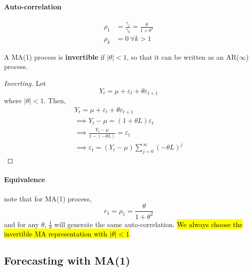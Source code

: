 \documentclass[11pt]{article}
\begin{document}
			\paragraph{Auto-correlation}
				\begin{align}
					\rho_1 &= \frac{\gamma_1}{\gamma_0}
					= \frac{\theta}{1 + \theta^2} \\
					\rho_k &= 0\ \forall k > 1
				\end{align}
				
			\begin{definition}
				A MA(1) process is \textbf{invertible} if $|\theta| < 1$, so that it can be written as an AR($\infty$) process.
			\end{definition}
			\begin{proof}[Inverting]
				Let 
				\begin{equation}
					Y_t = \mu + \varepsilon_t + \theta \varepsilon_{t+1}
				\end{equation}
				where $|\theta| < 1$.
				Then, 
				\begin{gather}
					Y_t = \mu + \varepsilon_t + \theta \varepsilon_{t+1} \\
					\implies Y_t - \mu = (1 + \theta L) \varepsilon_t \\ 
					\implies \frac{Y_t - \mu}{1 - (- \theta L)} = \varepsilon_t \\
					\implies \varepsilon_t = (Y_t - \mu) \sum_{j=0}^\infty (-\theta L)^j
				\end{gather}
			\end{proof}
			
			\paragraph{Equivalence} note that for MA(1) process,
				\begin{equation}
					r_1 = \rho_1 = \frac{\theta}{1 + \theta^2}
				\end{equation}
				and for any $\theta$, $\frac{1}{\theta}$ will generate the same auto-correlation. \hl{We always choose the invertible MA representation with $|\theta| < 1$}.
				
		\subsection{Forecasting with MA(1)}
\end{document}
